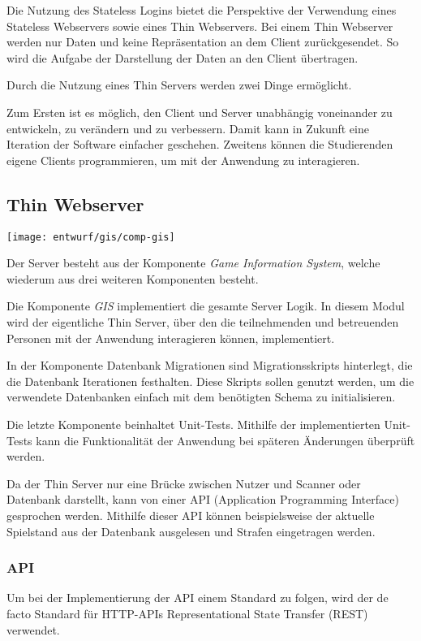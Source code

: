Die Nutzung des Stateless Logins bietet die Perspektive der Verwendung eines Stateless Webservers sowie eines Thin Webservers. Bei einem Thin Webserver werden nur Daten und keine Repräsentation an dem Client zurückgesendet. So wird die Aufgabe der Darstellung der Daten an den Client übertragen.

Durch die Nutzung eines Thin Servers werden zwei Dinge ermöglicht. 

Zum Ersten ist es möglich, den Client und Server unabhängig voneinander zu entwickeln, zu verändern und zu verbessern. Damit kann in Zukunft eine Iteration der Software einfacher geschehen. Zweitens können die Studierenden eigene Clients programmieren, um mit der Anwendung zu interagieren.

\subsection{Thin Webserver}
\begin{center}
	\texttt{[image: entwurf/gis/comp-gis]}
\end{center}

Der Server besteht aus der Komponente \textit{Game Information System}, welche wiederum aus drei weiteren Komponenten besteht. 

Die Komponente \textit{GIS} implementiert die gesamte Server Logik. In diesem Modul wird der eigentliche Thin Server, über den die teilnehmenden und betreuenden Personen mit der Anwendung interagieren können, implementiert.

In der Komponente Datenbank Migrationen sind Migrationsskripts hinterlegt, die die Datenbank Iterationen festhalten. Diese Skripts sollen genutzt werden, um die verwendete Datenbanken einfach mit dem benötigten Schema zu initialisieren. 

Die letzte Komponente beinhaltet Unit-Tests. Mithilfe der implementierten Unit-Tests kann die Funktionalität der Anwendung bei späteren Änderungen überprüft werden.

Da der Thin Server nur eine Brücke zwischen Nutzer und Scanner oder Datenbank darstellt, kann von einer API (Application Programming Interface) gesprochen werden. Mithilfe dieser API können beispielsweise der aktuelle Spielstand aus der Datenbank ausgelesen und Strafen eingetragen werden.

\subsubsection{API}
Um bei der Implementierung der API einem Standard zu folgen, wird der de facto Standard für HTTP-APIs Representational State Transfer (REST) verwendet.

